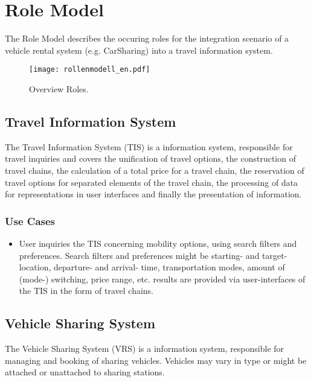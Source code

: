 \chapter{Role Model}
\label{cha:Rollenmodell}

The Role Model describes the occuring roles for the integration scenario of a vehicle rental system (e.g. CarSharing) into a travel information system.

\begin{figure*}[ht]
\centering
\texttt{[image: rollenmodell\_en.pdf]}
\caption{Overview Roles.\label{fig:Rollenmodell}}
\end{figure*}

\section*{Travel Information System}
\label{sec:Rollenmodell:RIS}
The Travel Information System (TIS) is a information system, responsible for travel inquiries and covers the unification of travel options, the construction of travel chains, the calculation of a total price for a travel chain, the reservation of travel options for separated elements of the travel chain, the processing of data for representations in user interfaces and finally the presentation of information.

\subsection*{Use Cases}
\begin{itemize}
\item User inquiries the TIS concerning mobility options, using search filters and preferences. Search filters and preferences might be starting- and target- location, departure- and arrival- time, transportation modes, amount of (mode-) switching, price range, etc. results are provided via user-interfaces of the TIS in the form of travel chains. 
\end{itemize}

\section*{Vehicle Sharing System}
\label{sec:Rollenmodell:FVS}
The Vehicle Sharing System (VRS) is a information system, responsible for managing and booking of sharing vehicles. Vehicles may vary in type or might be attached or unattached to sharing stations.

